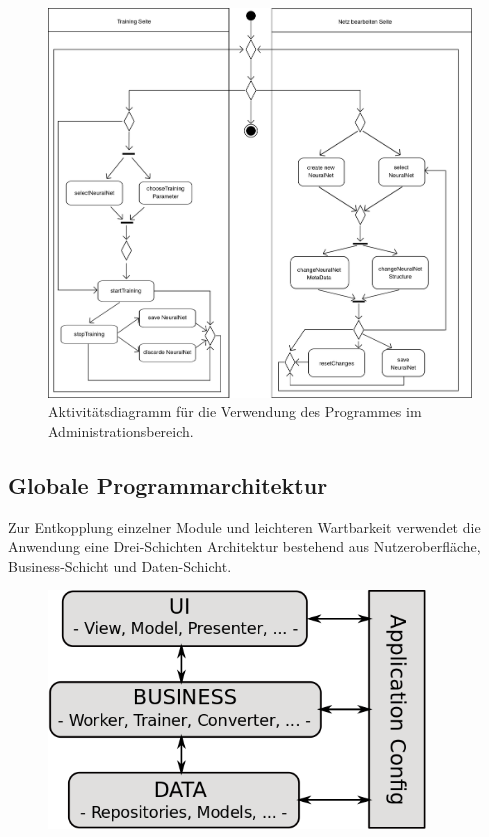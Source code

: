 \begin{figure}[H]
\begin{center}
\includegraphics[width=\textwidth]{Abbildungen/UML/jan/trainingConfigAD.png}
\caption{Aktivitätsdiagramm für die Verwendung des Programmes im Administrationsbereich.}
\label{fig_trainingConfigAD}
\end{center}
\end{figure}

\subsection{Globale Programmarchitektur}

Zur Entkopplung einzelner Module und leichteren Wartbarkeit verwendet die Anwendung eine Drei-Schichten Architektur bestehend aus Nutzeroberfläche, Business-Schicht und Daten-Schicht. 
\begin{figure}[H]
\begin{center}
\includegraphics[width=10cm]{Abbildungen/UML/jan/SchichtenModell.png}
\end{center}
\end{figure}

